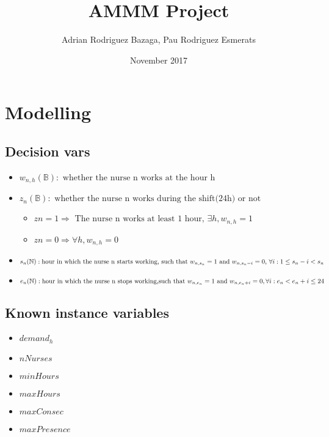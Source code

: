 \title{AMMM Project}
\author{Adrian Rodriguez Bazaga, Pau Rodriguez Esmerats }
\date{November 2017}



\maketitle





\section{ Modelling }


\subsection{ Decision vars }

\begin{itemize}

\item $ w_{n,h} (\mathbb{B})  : \text{ whether the nurse n works at the hour h }  $
\item $ z_{n} (\mathbb{B})  : \text{ whether the nurse n works during the shift(24h) or not } $ 
	\begin{itemize}[label=$\star$]
 	\item $ z{n} = 1  \Rightarrow \text{ The nurse n works at least 1 hour, } \exists h, w_{n,h} = 1 $ 
 	\item $ z{n} = 0 \Rightarrow \forall h, w_{n,h} = 0 $ 
 	\end{itemize}
\item $  s_{n} (\mathbb{N}) : \text{hour in which the nurse n starts working,} \\ \text{  such that $ w_{n,s_{n}}=1 $ and  $ w_{n,s_{n}-i}=0 $,  $ \forall i: 1 \leq s_{n} - i < s_{n} $ } $
\item $  e_{n} (\mathbb{N}) : \text{hour in which the nurse n stops working,} \\ \text{such that $ w_{n,e_{n}}=1 $ and  $ w_{n,e_{n}+i}=0,\forall i : e_{n} < e_{n}+i \leq 24 $  } $
\end{itemize}

\subsection{  Known instance variables }

\begin{itemize}
\item  $ demand_h $
\item  $ nNurses  $
\item  $minHours $
\item  $maxHours $
\item  $maxConsec $
\item  $maxPresence $
\end{itemize}

